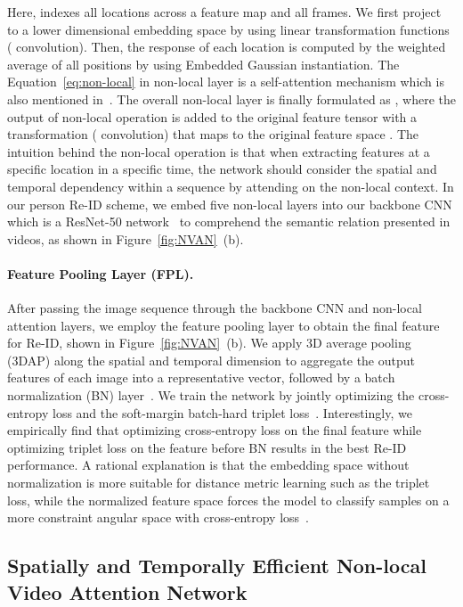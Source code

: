 \documentclass{bmvc2k}
\newcommand{\revctliu}[1]{#1}
\newcommand{\revctliu}[1]{\textcolor{brown}{#1}}
\begin{document}
Here,  indexes all locations across a feature map and all frames.
We first project  to a lower dimensional embedding space  by using linear transformation functions  ( convolution).
Then, the response of each location  is computed by the weighted average of all positions  by using Embedded Gaussian instantiation. The Equation~\ref{eq:non-local} in non-local layer is a self-attention mechanism which is also mentioned in~\cite{non-local}.
The overall non-local layer is finally formulated as , where the output of non-local operation is added to the original feature tensor  with a \revctliu{transformation  ( convolution) that maps  to the original feature space }.
The intuition behind the non-local operation is that when extracting features at a specific location in a specific time, the network should consider the spatial and temporal dependency within a sequence by attending on the non-local context.
In our person Re-ID scheme, we embed five non-local layers into our backbone \revctliu{CNN which is a ResNet-50 network~\cite{resnet}} to comprehend the semantic relation presented in videos, as shown in Figure~\ref{fig:NVAN}~(b).



\paragraph{Feature Pooling Layer (FPL).}
After passing the image sequence through the backbone CNN and non-local attention layers, we employ the feature pooling layer to obtain the final feature for Re-ID, shown in Figure~\ref{fig:NVAN}~(b).
We apply 3D average pooling (3DAP) along the spatial and temporal dimension to aggregate the output features of each image into a representative vector, followed by a batch normalization (BN) layer~\cite{bn}. 
We train the network by jointly optimizing the cross-entropy loss and the soft-margin batch-hard triplet loss~\cite{trip}.
Interestingly, we empirically find that optimizing cross-entropy loss on the final feature while optimizing triplet loss on the feature before BN results in the best Re-ID performance.
A rational explanation is that the embedding space without normalization is more suitable for distance metric learning such as the triplet loss, while the normalized feature space forces the model to classify samples on a more constraint angular space with cross-entropy loss~\cite{trip,sphereface,arcface,cosface}. 


 \subsection{Spatially and Temporally Efficient Non-local Video Attention Network}
\label{sub:STEN}
\end{document}
